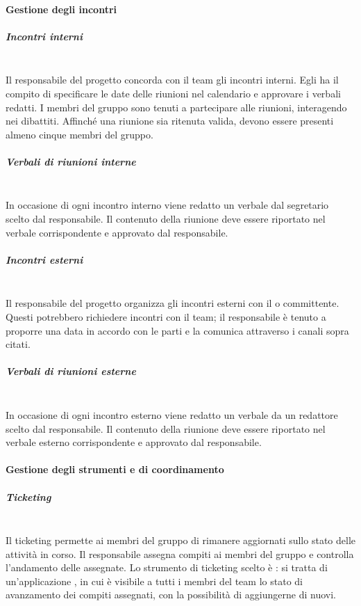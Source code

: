 \paragraph{Gestione degli incontri}
\subparagraph{Incontri interni} \mbox{} \\
Il responsabile del progetto concorda con il team gli incontri interni. Egli ha il compito di specificare le date delle riunioni nel calendario e approvare i verbali redatti. I membri del gruppo sono tenuti a partecipare alle riunioni, interagendo nei dibattiti. Affinché una riunione sia ritenuta valida, devono essere presenti almeno cinque membri del gruppo.
\subparagraph{Verbali di riunioni interne} \mbox{} \\
In occasione di ogni incontro interno viene redatto un verbale dal segretario scelto dal responsabile. Il contenuto della riunione deve essere riportato nel verbale corrispondente e approvato dal responsabile.
\subparagraph{Incontri esterni} \mbox{} \\
Il responsabile del progetto organizza gli incontri esterni con il  o committente. Questi potrebbero richiedere incontri con il team; il responsabile è tenuto a proporre una data in accordo con le parti e la comunica attraverso i canali sopra citati.
\subparagraph{Verbali di riunioni esterne} \mbox{} \\
In occasione di ogni incontro esterno viene redatto un verbale da un redattore scelto dal responsabile. Il contenuto della riunione deve essere riportato nel verbale esterno corrispondente e approvato dal responsabile.
\paragraph{Gestione degli strumenti e di coordinamento}
\subparagraph{Ticketing} \mbox{} \\
Il ticketing permette ai membri del gruppo di rimanere aggiornati sullo stato delle attività in corso. Il responsabile assegna compiti ai membri del gruppo e controlla l'andamento delle  assegnate. Lo strumento di ticketing scelto è : si tratta di un'applicazione , in cui è visibile a tutti i membri del team lo stato di avanzamento dei compiti assegnati, con la possibilità di aggiungerne di nuovi. 


